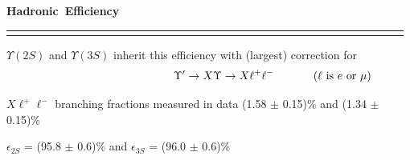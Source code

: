 \documentclass[landscape]{article}
\newenvironment{slide}[1][ ]{\mbox{\bf #1 } \vfill}{\vfill \mbox{ } \pagebreak}
\begin{document}
\begin{slide}[Hadronic Efficiency]
\begin{tabular}{p{0.6\linewidth} c p{0.38\linewidth}}
\begin{minipage}{\linewidth}
	\vspace{-0.75 cm}
      \end{minipage}
    \end{tabular}

\vspace{1.5 cm} $\Upsilon(2S)$ and $\Upsilon(3S)$ inherit this efficiency with (largest) correction for
\[ \mbox{\hspace{4 cm}} \Upsilon' \to X \Upsilon \to X \ell^+\ell^- \mbox{ \hspace{1 cm} ($\ell$ is $e$ or $\mu$)}\]

\vspace{0.75 cm} $X \ell^+\ell^-$ branching fractions measured in data (1.58 $\pm$ 0.15)\% and (1.34 $\pm$ 0.15)\%

\vspace{1 cm} $\epsilon_{2S}$ = (95.8 $\pm$ 0.6)\% and $\epsilon_{3S}$ = (96.0 $\pm$ 0.6)\%

\vspace{-1 cm}

\end{slide}
\end{document}
